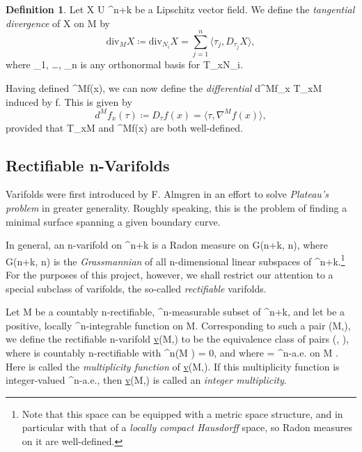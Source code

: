 \documentclass[a4paper, 11pt]{article}
\theoremstyle{plain}
\theoremstyle{definition}
\newtheorem{definition}[theorem]{Definition}
\theoremstyle{remark}
\renewcommand{\div}{\text{div}} %
\numberwithin{equation}{subsection}
\def\({}
\def\){}
\begin{document}
\begin{definition}
Let \(X \vcentcolon U \rightarrow {}^{n+k}\) be a Lipschitz vector field. We define the \emph{tangential divergence} of \(X\) on \(M\) by
\begin{equation}
\div_{M}X \coloneq \div_{N_i}X = \sum_{j=1}^{n} \langle \tau_{j}, D_{\tau_{j}}X \rangle,
\end{equation}
where \(\tau_{1}, \ldots, \tau_{n}\) is any orthonormal basis for \(T_{x}N_{i}\). 
\end{definition}

Having defined \(\nabla^{M}f(x)\), we can now define the \emph{differential} \(d^{M}f_{x} \vcentcolon T_{x}M \rightarrow {}\) induced by \(f\). This is given by
\begin{equation}
d^{M}f_{x}(\tau) \coloneq D_{\tau}f(x) = \langle \tau, \nabla^{M}f(x) \rangle,
\end{equation}
provided that \(T_{x}M\) and \(\nabla^{M}f(x)\) are both well-defined.

\subsection{Rectifiable \(n\)-Varifolds}

Varifolds were first introduced by F. Almgren in an effort to solve \emph{Plateau's problem} in greater generality. Roughly speaking, this is the problem of finding a minimal surface spanning a given boundary curve.

In general, an \(n\)-varifold on \(\Omega \subset {}^{n+k}\) is a Radon measure on \(\Omega \times G(n+k, n)\), where \(G(n+k, n)\) is the \emph{Grassmannian} of all \(n\)-dimensional linear subspaces of \(^{n+k}\).\footnote{Note that this space can be equipped with a metric space structure, and in particular with that of a \emph{locally compact Hausdorff} space, so Radon measures on it are well-defined.} For the purposes of this project, however, we shall restrict our attention to a special subclass of varifolds, the so-called \emph{rectifiable} varifolds.

Let \(M\) be a countably \(n\)-rectifiable, \(^{n}\)-measurable subset of \(^{n+k}\), and let \(\theta\) be a positive, locally \(^{n}\)-integrable function on \(M\). Corresponding to such a pair \((M,\theta)\), we define the rectifiable \(n\)-varifold \(\underline{v}(M,\theta)\) to be the equivalence class of pairs \((, \tilde{\theta})\), where \(\) is countably \(n\)-rectifiable with \(^{n}(M \triangle {}) = 0\), and where \(\theta = \tilde{\theta}\) \(^{n}\)-a.e. on \(M \cap {}\). Here \(\theta\) is called the \emph{multiplicity function} of \(\underline{v}(M,\theta)\). If this multiplicity function is integer-valued \(^{n}\)-a.e., then \(\underline{v}(M,\theta)\) is called an \emph{integer multiplicity}.
\end{document}
